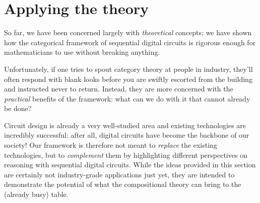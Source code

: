 \chapter{Applying the theory}

So far, we have been concerned largely with \emph{theoretical} concepts; we have
shown how the categorical framework of sequential digital circuits is rigorous
enough for mathematicians to use without breaking anything.

Unfortunately, if one tries to spout category theory at people in industry,
they'll often respond with blank looks before you are swiftly escorted from the
building and instructed never to return.
Instead, they are more concerned with the \emph{practical} benefits of the
framework: what can we do with it that cannot already be done?

Circuit design is already a very well-studied area and existing technologies are
incredibly successful: after all, digital circuits have become the backbone of
our society!
Our framework is therefore not meant to \emph{replace} the existing
technologies, but to \emph{complement} them by highlighting different
perspectives on reasoning with sequential digital circuits.
While the ideas provided in this section are certainly not industry-grade
applications just yet, they are intended to demonstrate the potential of what
the compositional theory can bring to the (already busy) table.







